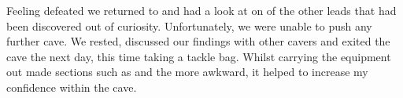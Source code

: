 Feeling defeated we returned to
 and had a look at on of the other leads that
had been discovered out of curiosity. Unfortunately, we were unable to
push any further cave. We rested, discussed our findings with other
cavers and exited the cave the next day, this time taking a tackle bag.
Whilst carrying the equipment out made sections such as  and
the  more awkward, it helped to increase my confidence
within the cave.



